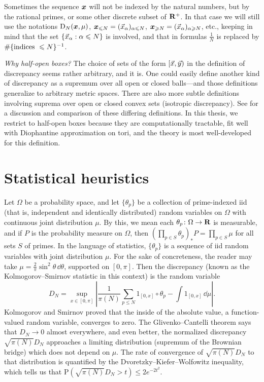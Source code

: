 Sometimes the sequence ${\boldsymbol x}$ will not be indexed by the natural numbers, but 
by the rational primes, or some other discrete subset of $\mathbf{R}^+$. In that case 
we will still use the notations $\operatorname{D}_N({\boldsymbol x},\mu)$, 
${\boldsymbol x}_{\leqslant N} = (\vec{x}_\alpha)_{\alpha\leqslant N}$, 
${\boldsymbol x}_{\geqslant N} = (\vec{x}_\alpha)_{\alpha\geqslant N}$, etc., 
keeping in mind that the set $\{\vec{x}_\alpha : \alpha \leqslant N\}$ is involved, 
and that in formulas $\frac{1}{N}$ is replaced by 
$\#\{\textnormal{indices }\leqslant N\}^{-1}$. 

\emph{Why half-open boxes?} The choice of sets of the form $[\vec{x},\vec{y})$ in the 
definition of discrepancy seems rather arbitrary, and it is. One could easily 
define another kind of discrepancy as a supremum over all open or closed 
balls---and 
those  definitions generalize to arbitrary metric spaces. There are also more 
subtle definitions involving suprema over open or closed convex sets 
(isotropic discrepancy). See \cite{kuipers-niederreiter-1974} for a discussion 
and comparison of these differing definitions. In this thesis, we restrict to 
half-open boxes because they are computationally tractable, fit well with 
Diophantine approximation on tori, and the theory is most well-developed for 
this definition. 





\section{Statistical heuristics}

Let $\Omega$ be a probability space, and let $\{\theta_p\}$ be a collection of 
prime-indexed iid (that is, independent and identically distributed) 
random variables on 
$\Omega$ with continuous joint distribution $\mu$. By this, we mean each 
$\theta_p\colon \Omega \to \mathbf{R}$ is measurable, and if $P$ is the probability 
measure on $\Omega$, then 
$\left(\prod_{p\in S} \theta_p\right)_\ast P = \prod_{p\in S} \mu$ for all 
sets $S$ of primes. In 
the language of statistics, $\{\theta_p\}$ is a sequence of iid random 
variables with joint distribution $\mu$. For the sake of concreteness, the 
reader may take $\mu = \frac{2}{\pi} \sin^2 \theta\, \dd\theta$, 
supported on $[0,\pi]$. Then the discrepancy (known as the 
Kolmogorov--Smirnov statistic in this context) is the random variable 
\[
	D_N = \sup_{x\in [0,\pi]} \left|\frac{1}{\pi(N)} \sum_{p\leqslant N} 1_{[0,x]}\circ \theta_p - \int 1_{[0,x]}\, \dd\mu\right| .
\]
Kolmogorov and Smirnov proved that the inside of the absolute value, a 
function-valued random variable, converges 
to zero. The Glivenko--Cantelli theorem says that $D_N \to 0$ almost everywhere, 
and even better, the normalized discrepancy $\sqrt{\pi(N)} D_N$ approaches 
a limiting distribution (supremum of the Brownian bridge) which does not 
depend on $\mu$. The rate of convergence of $\sqrt{\pi(N)} D_N$ to that 
distribution is quantified by the Dvoretzky--Kiefer--Wolfowitz inequality, 
which tells us that 
$\mathrm{P}\left(\sqrt{\pi(N)} D_N > t\right) \leqslant 2 e^{-2 t^2}$. 

